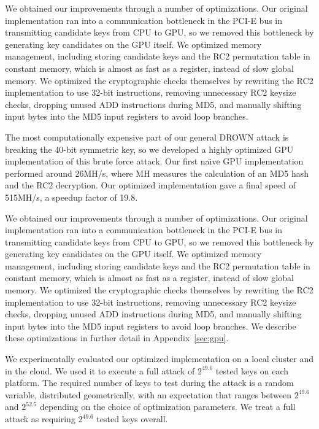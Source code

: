 %

We obtained our improvements through a number of optimizations.  Our original implementation ran into a communication bottleneck in the PCI-E bus in transmitting candidate keys from CPU to GPU, so we removed this bottleneck by generating key candidates on the GPU itself.  We optimized memory management, including storing candidate keys and the RC2 permutation table in constant memory, which is almost as fast as a register, instead of slow global memory.  We optimized the cryptographic checks themselves by rewriting the RC2 implementation to use 32-bit instructions, removing unnecessary RC2 keysize checks, dropping unused ADD instructions during MD5, and manually shifting input bytes into the MD5 input registers to avoid loop branches.
\fi


\label{sec:ec2_results}
\fi

The most computationally expensive part of our general DROWN attack is breaking the 40-bit symmetric key, so we developed a highly optimized GPU implementation of this brute force attack.  Our first na\"{\i}ve GPU implementation performed around 26MH/s, where MH measures the calculation of an MD5 hash and the RC2 decryption. Our optimized implementation gave a final speed of 515MH/s, a speedup factor of 19.8.  
\label{sec:gpu_brief}

We obtained our improvements through a number of optimizations.  Our original implementation ran into a communication bottleneck in the PCI-E bus in transmitting candidate keys from CPU to GPU, so we removed this bottleneck by generating key candidates on the GPU itself.  We optimized memory management, including storing candidate keys and the RC2 permutation table in constant memory, which is almost as fast as a register, instead of slow global memory.  We optimized the cryptographic checks themselves by rewriting the RC2 implementation to use 32-bit instructions, removing unnecessary RC2 keysize checks, dropping unused ADD instructions during MD5, and manually shifting input bytes into the MD5 input registers to avoid loop branches.  We describe these optimizations in further detail in Appendix~\ref{sec:gpu}.

We experimentally evaluated our optimized implementation on a local cluster and in the cloud.
We used it to execute a full attack of $2^{49.6}$ tested keys on each platform.
The required number of keys to test during the attack is a random variable, distributed geometrically, with an expectation that ranges between $2^{49.6}$ and $2^{52.5}$ depending on the choice of optimization parameters.
We treat a full attack as requiring $2^{49.6}$ tested keys overall.

